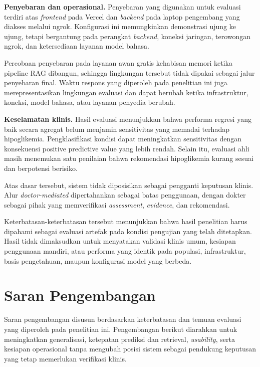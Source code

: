 \textbf{Penyebaran dan operasional.} Penyebaran yang digunakan untuk evaluasi terdiri atas \textit{frontend} pada Vercel dan \textit{backend} pada laptop
pengembang yang diakses melalui ngrok. Konfigurasi ini memungkinkan demonstrasi ujung ke ujung, tetapi bergantung pada perangkat \textit{backend}, koneksi
jaringan, terowongan ngrok, dan ketersediaan layanan model bahasa.

Percobaan penyebaran pada layanan awan gratis kehabisan memori ketika pipeline RAG dibangun, sehingga lingkungan tersebut tidak dipakai sebagai jalur
penyebaran final. Waktu respons yang diperoleh pada penelitian ini juga merepresentasikan lingkungan evaluasi dan dapat berubah ketika
infrastruktur, koneksi, model bahasa, atau layanan penyedia berubah.

\textbf{Keselamatan klinis.} Hasil evaluasi menunjukkan bahwa performa regresi yang baik secara agregat belum menjamin sensitivitas yang memadai terhadap hipoglikemia. Pengklasifikasi
kondisi dapat meningkatkan sensitivitas dengan konsekuensi positive predictive value yang lebih rendah. Selain itu, evaluasi ahli masih menemukan satu
penilaian bahwa rekomendasi hipoglikemia kurang sesuai dan berpotensi berisiko.

Atas dasar tersebut, sistem tidak diposisikan sebagai pengganti keputusan klinis. Alur \textit{doctor-mediated} dipertahankan sebagai batas penggunaan,
dengan dokter sebagai pihak yang memverifikasi \textit{assessment}, \textit{evidence}, dan rekomendasi.

Keterbatasan-keterbatasan tersebut menunjukkan bahwa hasil penelitian harus dipahami sebagai evaluasi artefak pada kondisi pengujian yang telah
ditetapkan. Hasil tidak dimaksudkan untuk menyatakan validasi klinis umum, kesiapan penggunaan mandiri, atau performa yang identik pada populasi,
infrastruktur, basis pengetahuan, maupun konfigurasi model yang berbeda.

\section{Saran Pengembangan}
\label{sec:bab7-saran-pengembangan}

Saran pengembangan disusun berdasarkan keterbatasan dan temuan evaluasi yang diperoleh pada penelitian ini. Pengembangan berikut diarahkan untuk
meningkatkan generalisasi, ketepatan prediksi dan retrieval, \textit{usability}, serta kesiapan operasional tanpa mengubah posisi sistem sebagai pendukung
keputusan yang tetap memerlukan verifikasi klinis.

